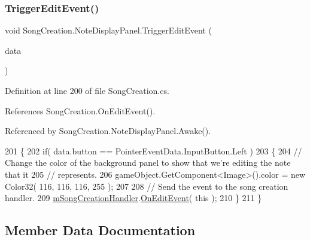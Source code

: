 \subsubsection{\texorpdfstring{Trigger\+Edit\+Event()}{TriggerEditEvent()}}
{\footnotesize\ttfamily void Song\+Creation.\+Note\+Display\+Panel.\+Trigger\+Edit\+Event (\begin{DoxyParamCaption}\item[{Pointer\+Event\+Data}]{data }\end{DoxyParamCaption})\hspace{0.3cm}{\ttfamily [private]}}



Definition at line 200 of file Song\+Creation.\+cs.



References Song\+Creation.\+On\+Edit\+Event().



Referenced by Song\+Creation.\+Note\+Display\+Panel.\+Awake().


\begin{DoxyCode}
201         \{
202             \textcolor{keywordflow}{if}( data.button == PointerEventData.InputButton.Left )
203             \{
204                 \textcolor{comment}{// Change the color of the background panel to show that we're editing the note that it }
205                 \textcolor{comment}{// represents.}
206                 gameObject.GetComponent<Image>().color = \textcolor{keyword}{new} Color32( 116, 116, 116, 255 );
207 
208                 \textcolor{comment}{// Send the event to the song creation handler.}
209                 \hyperlink{class_song_creation_1_1_note_display_panel_ab11cc1ad87541ada65b36e010d9c56c3}{mSongCreationHandler}.\hyperlink{class_song_creation_aa934a527e81454a71b82cd6918476bed}{OnEditEvent}( \textcolor{keyword}{this} );
210             \}
211         \}
\end{DoxyCode}


\subsection{Member Data Documentation}
\mbox{\label{class_song_creation_1_1_note_display_panel_a7a6d14026ca347c32b2842d5c9dc54e9}} 

